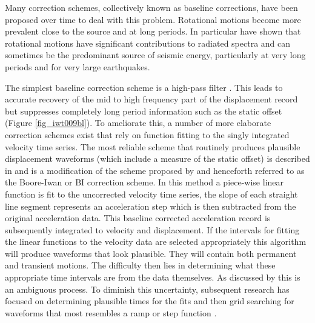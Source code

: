 Many correction schemes, collectively known as baseline corrections, have been proposed over time to deal with this problem. Rotational motions become more prevalent close to the source and at long periods. In particular \citet{Trifunac2001} have shown that rotational motions have significant contributions to radiated spectra and can sometimes be the predominant source of seismic energy, particularly at very long periods and for very large earthquakes. 

The simplest baseline correction scheme is a high-pass filter \citep{Boore2005}. This leads to accurate recovery of the mid to high frequency part of the displacement record but suppresses completely long period information such as the static offset (Figure \ref{fig_iwt009bl}). To ameliorate this, a number of more elaborate correction schemes exist \citep{Boore2005} that rely on function fitting to the singly integrated velocity time series. The most reliable scheme that routinely produces plausible displacement waveforms (which include a measure of the static offset) is described in \citet{Boore1999, Boore2001} and is a modification of the scheme proposed by \citet{Iwan1985} and henceforth referred to as the Boore-Iwan or BI correction scheme. In this method a piece-wise linear function is fit to the uncorrected velocity time series, the slope of each straight line segment represents an acceleration step which is then subtracted from the original acceleration data. This baseline corrected acceleration record is subsequently integrated to velocity and displacement. If the intervals for fitting the linear functions to the velocity data are selected appropriately this algorithm will produce waveforms that look plausible. They will contain both permanent and transient motions. The difficulty then lies in determining what these appropriate time intervals are from the data themselves. As discussed by \citet{Boore1999,Boore2001} this is an ambiguous process. To diminish this uncertainty, subsequent research has focused on determining plausible times for the fits and then grid searching for waveforms that most resembles a ramp or step function \citep{Wu2007,Chao2010,Wang2011}.

